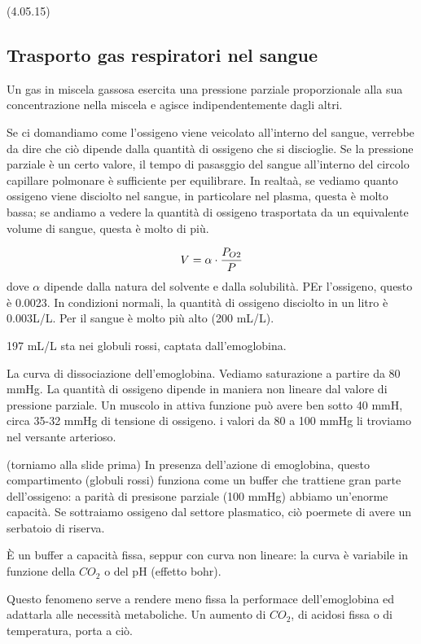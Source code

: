 \documentclass[a4paper,12pt]{article}
\begin{document}
(4.05.15)
\subsection{Trasporto gas respiratori nel sangue}

Un gas in miscela gassosa esercita una pressione parziale proporzionale alla sua concentrazione nella miscela e agisce indipendentemente dagli altri. 

Se ci domandiamo come l'ossigeno viene veicolato all'interno del sangue, verrebbe da dire che ciò dipende dalla quantità di ossigeno che si discioglie. Se la pressione parziale è un certo valore, il tempo di pasasggio del sangue all'interno del circolo capillare polmonare è sufficiente per equilibrare. In realtaà, se vediamo quanto ossigeno viene disciolto nel sangue, in particolare nel plasma, questa è molto bassa; se andiamo a vedere la quantità di ossigeno trasportata da un equivalente volume di sangue, questa è molto di più.

\begin{equation}
\centering
V=\alpha \cdot \frac{P_ {O2}}{P}
\end{equation}
dove $\alpha$ dipende dalla natura del solvente e dalla solubilità. PEr l'ossigeno, questo è 0.0023. In condizioni normali, la quantità di ossigeno disciolto in un litro è 0.003L/L. Per il sangue è molto più alto (200 mL/L).

197 mL/L sta nei globuli rossi, captata dall'emoglobina.

La curva di dissociazione dell'emoglobina. Vediamo saturazione a partire da 80 mmHg. La quantità di ossigeno dipende in maniera non lineare dal valore di pressione parziale. Un muscolo in attiva funzione può avere ben sotto 40 mmH, circa 35-32 mmHg di tensione di ossigeno. i valori da 80 a 100 mmHg li troviamo nel versante arterioso.

(torniamo alla slide prima)
In presenza dell'azione di emoglobina, questo compartimento (globuli rossi) funziona come un buffer che trattiene gran parte dell'ossigeno: a parità di presisone parziale (100 mmHg) abbiamo un'enorme capacità. Se sottraiamo ossigeno dal settore plasmatico, ciò poermete di avere un serbatoio di riserva. 

È un buffer a capacità fissa, seppur con curva non lineare: la curva è variabile in funzione della $CO_{2}$ o del pH (effetto bohr).

Questo fenomeno serve a rendere meno fissa la performace dell'emoglobina ed adattarla alle necessità metaboliche. Un aumento di $CO_{2}$, di acidosi fissa o di temperatura, porta a ciò.
\end{document}
